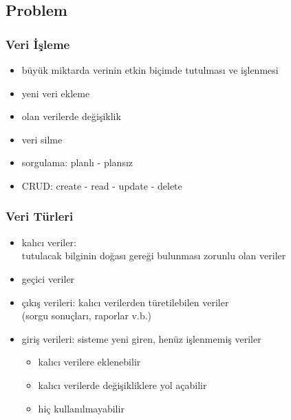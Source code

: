 \documentclass[dvipsnames]{beamer}
\theoremstyle{plain}
\begin{document}
\subsection{Problem}

\begin{frame}
  \frametitle{Veri İşleme}

  \begin{itemize}
    \item büyük miktarda verinin etkin biçimde tutulması ve işlenmesi

    \medskip  
    \item yeni veri ekleme
    \item olan verilerde değişiklik
    \item veri silme
    \item sorgulama: planlı - plansız
     
    \pause
    \smallskip    
    \item \alert{CRUD}: create - read - update - delete
  \end{itemize}
\end{frame}


\begin{frame}
  \frametitle{Veri Türleri}

  \begin{itemize}
    \item \alert{kalıcı veriler}:\\
      tutulacak bilginin doğası gereği bulunması zorunlu olan veriler

    \bigskip
    \item geçici veriler
    \smallskip   
      \item çıkış verileri: kalıcı verilerden türetilebilen veriler\\
        (sorgu sonuçları, raporlar v.b.)
      \item giriş verileri: sisteme yeni giren, henüz işlenmemiş veriler
      \begin{itemize}
        \item kalıcı verilere eklenebilir
        \item kalıcı verilerde değişikliklere yol açabilir
        \item hiç kullanılmayabilir
       \end{itemize}
  \end{itemize}
\end{frame}
\end{document}
